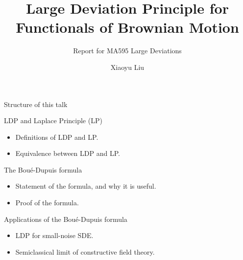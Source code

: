 \documentclass{if-beamer}
\title[Boué-Dupuis]{Large Deviation Principle for Functionals of Brownian Motion}
\subtitle{Report for MA595 Large Deviations}
\author[Liu]{Xiaoyu Liu} %
\institute[Purdue]{Purdue University \and \textbf{Instructed by Prof. Jonathon Peterson}}
\begin{document}
\begin{frame}
  \titlepage
\end{frame}


\begin{frame}{Structure of this talk}

\begin{block}{LDP and Laplace Principle (LP)}
    \begin{itemize}
        \item Definitions of LDP and LP.
        \item Equivalence between LDP and LP.
    \end{itemize}
\end{block}

\begin{block}{The Boué-Dupuis formula}
    \begin{itemize}
        \item Statement of the formula, and why it is useful.
        \item Proof of the formula.
    \end{itemize}
\end{block}

\begin{block}{Applications of the Boué-Dupuis formula}
    \begin{itemize}
        \item LDP for small-noise SDE.
        \item Semiclassical limit of constructive field theory.
    \end{itemize}
\end{block}


\end{frame}
\end{document}
